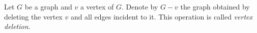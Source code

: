 

\setcounter{section}{2}
\setcounter{subsection}{2}
\setcounter{dfn}{5}

\begin{dfn}
Let $G$ be a graph and $v$ a vertex of $G$.
Denote by $G - v$ the graph obtained by deleting the vertex $v$ and all edges incident to it.
This operation is called \emph{vertex deletion}.
\end{dfn}

